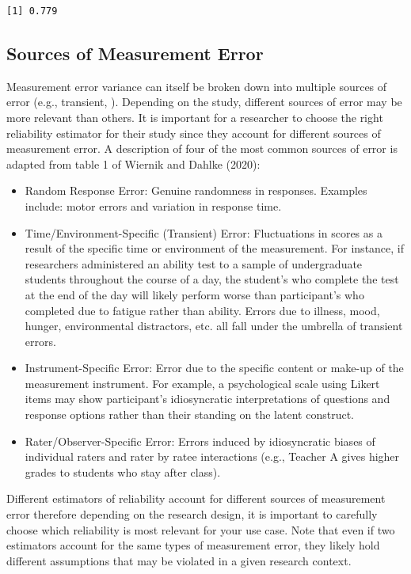 \documentclass[
  letterpaper,
  DIV=11,
  numbers=noendperiod]{scrreprt}
\begin{document}
\begin{verbatim}
[1] 0.779
\end{verbatim}

\hypertarget{sec-sources}{%
\subsection{Sources of Measurement Error}\label{sec-sources}}

Measurement error variance can itself be broken down into multiple
sources of error (e.g., transient, ). Depending on the study, different
sources of error may be more relevant than others. It is important for a
researcher to choose the right reliability estimator for their study
since they account for different sources of measurement error. A
description of four of the most common sources of error is adapted from
table 1 of Wiernik and Dahlke (2020):

\begin{itemize}
\item
  Random Response Error: Genuine randomness in responses. Examples
  include: motor errors and variation in response time.
\item
  Time/Environment-Specific (Transient) Error: Fluctuations in scores as
  a result of the specific time or environment of the measurement. For
  instance, if researchers administered an ability test to a sample of
  undergraduate students throughout the course of a day, the student's
  who complete the test at the end of the day will likely perform worse
  than participant's who completed due to fatigue rather than ability.
  Errors due to illness, mood, hunger, environmental distractors, etc.
  all fall under the umbrella of transient errors.
\item
  Instrument-Specific Error: Error due to the specific content or
  make-up of the measurement instrument. For example, a psychological
  scale using Likert items may show participant's idiosyncratic
  interpretations of questions and response options rather than their
  standing on the latent construct.
\item
  Rater/Observer-Specific Error: Errors induced by idiosyncratic biases
  of individual raters and rater by ratee interactions (e.g., Teacher A
  gives higher grades to students who stay after class).
\end{itemize}

Different estimators of reliability account for different sources of
measurement error therefore depending on the research design, it is
important to carefully choose which reliability is most relevant for
your use case. Note that even if two estimators account for the same
types of measurement error, they likely hold different assumptions that
may be violated in a given research context.
\end{document}
